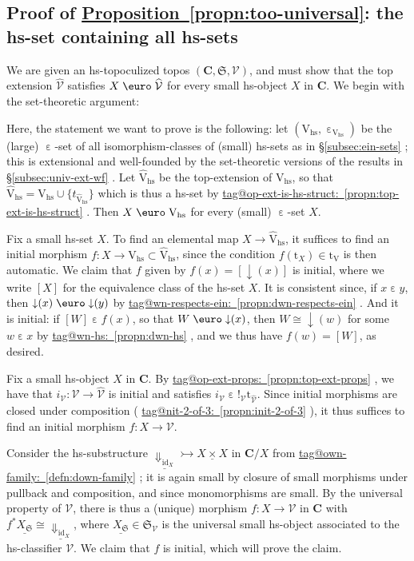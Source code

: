 \documentclass{amsart}
\makeatletter
\newcommand\alttext{\texorpdfstring}
\newcommand\bC{\mathbf{C}}
\newcommand\cV{\mathcal{V}}
\newcommand\dwnfn{{\downarrow}}
\newcommand\Dwn{{\Downarrow}}
\newcommand\Ein{\mathrel{\text{\textup{\euro}}}}
\newcommand\ein{\mathrel{\varepsilon}}
\newcommand\fS{\mathfrak{S}}
\newcommand\hs{\mathrm{hs}}
\newcommand\id{\mathrm{id}}
\newcommand\rt{\mathrm{t}}
\newcommand\rV{\mathrm{V}}
\newcommand\set[2][]{#1\{ #2 #1\}}
\newcommand\tto{\rightarrowtail}
\newcommand\und[1]{\underline{#1}}
\newcommand\unein{{\ein}}
\newcommand\unex{{!}}
\newcommand\wh[1]{\widehat{#1}}
\newcommand\tagword[1]{\csname tag@#1\endcsname}
\def\label@tag#1:#2\@nil{#1}
\newcommand\labeltag[1]{\label@tag#1:\@nil}
\newcommand\jref[1]{%
  \texorpdfstring%
    {\hyperref[#1]{\tagword{\labeltag{#1}}~\ref*{#1}}}%
    {\tagword{\labeltag{#1}}~\ref*{#1}}%
}
\newcommand\prerefpost[3]{%
  \texorpdfstring%
    {\hyperref[#2]{#1\ref*{#2}#3}}%
    {#1\ref*{#2}#3}%
}
\newcommand\sref[1]{\prerefpost{\S}{#1}{}}
\theoremstyle{definition}
\theoremstyle{remark}
\theoremstyle{plainwithref}
\newenvironment{settybox}{\begin{tcolorbox}[colback=blue!20,breakable%
    ,enhanced%
    ,sharp corners%
    ,frame hidden%
    ,boxsep=0pt
    ,left=5pt,right=5pt,top=5pt,bottom=5pt
    ,enlarge left by=-5pt,width=\linewidth+10pt
    ,enlarge top by=5pt,enlarge bottom by=5pt
    ,before skip balanced=0pt,after skip balanced=0pt
    ]}{\end{tcolorbox}}
\makeatother
\begin{document}
\subsection{Proof of \alttext{\hyperref[propn:too-universal]{Proposition~\ref*{propn:too-universal}}}{Proposition~\ref*{propn:too-universal}}: the hs-set containing all hs-sets} \label{subsec:too-universal-proofs}
We are given an hs-topoculized topos \( (\bC, \fS, \cV) \), and must show that the top extension \( \wh \cV \) satisfies \( X \Ein \wh \cV \) for every small hs-object \( X \) in \( \bC \).
We begin with the set-theoretic argument:
\begin{settybox}
  Here, the statement we want to prove is the following: let \( (\rV_{\hs}, \unein_{\rV_{\hs}}) \) be the (large) \( {\unein} \)-set of all isomorphism-classes of (small) hs-sets as in \sref{subsec:ein-sets}; this is extensional and well-founded by the set-theoretic versions of the results in \sref{subsec:univ-ext-wf}.
  Let \( \wh \rV_\hs \) be the top-extension of \( \rV_\hs \), so that \( \wh \rV_\hs = \rV_\hs \cup \set{t_{\wh \rV_\hs}} \) which is thus a hs-set by \jref{propn:top-ext-is-hs-struct}.
  Then \( X \Ein \rV_{\hs} \) for every (small) \( \unein \)-set \( X \).

  Fix a small hs-set \( X \).
  To find an elemental map \( X \to \wh \rV_\hs \), it suffices to find an initial morphism \( f \colon X \to \rV_{\hs} \subset \wh \rV_\hs \), since the condition \( f(\rt_X) \in \rt_{\rV} \) is then automatic.
  We claim that \( f \) given by \( f(x) = [\dwnfn(x)] \) is initial, where we write \( [X] \) for the equivalence class of the hs-set \( X \).
  It is consistent since, if \( x \ein y \), then \( \dwnfn(x) \Ein \dwnfn(y) \) by \jref{propn:dwn-respects-ein}.
  And it is initial: if \( [W] \ein f(x) \), so that \( W \Ein \dwnfn(x) \), then \( W \cong \dwnfn(w) \) for some \( w \ein x \) by \jref{propn:dwn-hs}, and we thus have \( f(w) = [W] \), as desired.
\end{settybox}

Fix a small hs-object \( X \) in \( \bC \).
By \jref{propn:top-ext-props}, we have that \( i_{\cV} \colon \cV \to \wh \cV \) is initial and satisfies \( i_{\cV} \ein \unex_{\cV} \rt_{\wh \cV} \).
Since initial morphisms are closed under composition (\jref{propn:init-2-of-3}), it thus suffices to find an initial morphism \( f \colon X \to \cV \).

Consider the hs-substructure \( \und{\Dwn_{\id_X}} \tto \und{X \times X} \) in \( \bC / X \) from \jref{defn:down-family}; it is again small by closure of small morphisms under pullback and composition, and since monomorphisms are small.
By the universal property of \( \cV \), there is thus a (unique) morphism \( f \colon X \to \cV \) in \( \bC \) with \( f^* \und{X_\fS} \cong \und{\Dwn_{\id_X}} \), where \( \und{X_\fS} \in \fS_\cV \) is the universal small hs-object associated to the hs-classifier \( \cV \).
We claim that \( f \) is initial, which will prove the claim.
\end{document}
